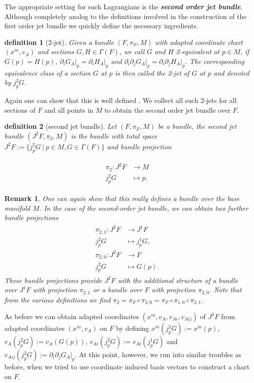 \documentclass[a4paper,12pt, DIV=14, BCOR=5mm, twoside, headsepline, numbers=noenddot]{scrbook}
\newtheorem{definition}{definition}[section]
\newtheorem*{remark}{Remark}
\begin{document}
The appropriate setting for such Lagrangians is the \textbf{\textit{second order jet bundle}}. Although completely analog to the definitions involved in the construction of the first order jet bundle we quickly define the necessary ingredients. 
\begin{definition}[2-jet]
Given a bundle $(F, \pi_F, M)$ with adapted coordinate chart $(x^m, v_A)$ and sections $G,H \in \Gamma(F)$, we call $G$ and $H$ 2-equivalent at $p \in M$, if $G(p) = H(p)$, $\partial_i G_A \vert_p = \partial_i H_A \vert_p$ and $\partial_i \partial_j G_A \vert_ p = \partial_i \partial_j H_A \vert_ p $. The corresponding equivalence class of a section $G$ at $p$ is then called the 2-jet of $G$ at $p$ and denoted by $j^2_pG$.
\end{definition}
Again one can show that this is well defined \cite{saunders_1989}. We collect all such 2-jets for all sections of $F$ and all points in $M$ to obtain the second order jet bundle over $F$.
\begin{definition}[second jet bundle]
Let $(F, \pi_F, M)$ be a bundle, the second jet bundle $(J^2F,\pi_2,M)$ is the bundle with total space $J^2F := \{j^2_pG \  \vert \  p \in M, G \in \Gamma(F)\}$ and bundle projection 

\begin{align}
    \begin{aligned}
\pi_2 : J^2F &\longrightarrow M \\
j^2_pG &\longmapsto p.
    \end{aligned}
\end{align}
\end{definition}
\begin{remark}
One can again show that this really defines a bundle over the base manifold $M$. In the case of the second-order jet bundle, we can obtain two further bundle projections 
\begin{align}
    \begin{aligned}
    \pi_{2,1} : J^2F &\longrightarrow J^1F \\
    j^2_pG &\longmapsto j^1_pG ,\\[0.5ex]
    \pi_{2,0} : J^2F &\longrightarrow F \\
    j^2_pG &\longmapsto G(p).
    \end{aligned}
\end{align}
These bundle projections provide $J^2F$ with the additional structure of a bundle over $J^1F$ with projection $\pi_{2,1}$ or a bundle over $F$ with projection $\pi_{2,0}$. Note that from the various definitions we find $\pi_{2} = \pi_F \circ \pi_{2,0} = \pi_F \circ \pi_{1,0} \circ \pi_{2,1}$.
\end{remark}
As before we can obtain adapted coordinates $(x^m, v_A, v_{Ai},v_{Aij})$ of $J^2F$ from adapted coordinates $(x^m,v_A)$ on $F$ by defining $x^m(j^2_pG) := x^m(p)$, $v_A(j^2_pG):= v_A(G(p))$, $v_{Ai}(j^2_pG) := v_{Ai}(j^1_pG)$ and $v_{Aij}(j^2_pG) := \partial_i \partial_j G_A \vert _p$. 
At this point, however, we run into similar troubles as before, when we tried to use coordinate induced basis vectors to construct a chart on $F$. 
\end{document}
